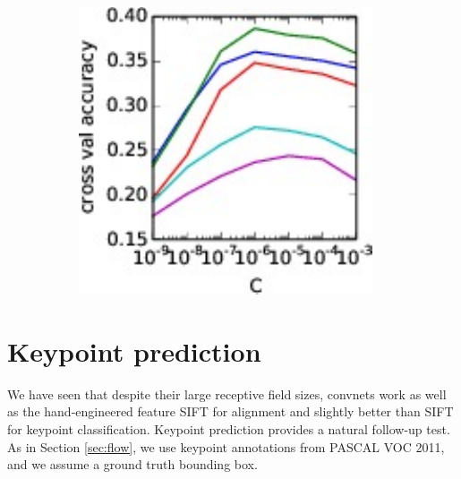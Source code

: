 \documentclass{article} %
\begin{document}
\begin{figure}[t]
\begin{minipage}{0.4\textwidth}
\begin{subfigure}{0.45\textwidth}
\caption{}
\end{subfigure}
\begin{subfigure}{0.45\textwidth}
\includegraphics[width=\textwidth]{figures/cat_cv_sift_nolegend.pdf}
\caption{}
\end{subfigure}
\label{fig:cv}
\end{minipage}
\end{figure}

\section{Keypoint prediction}
\label{sec:pred}

We have seen that 
despite their large receptive field sizes, convnets work as well as the hand-engineered
feature SIFT for alignment and slightly better than SIFT for
keypoint classification. Keypoint prediction provides a natural follow-up test.
As in Section \ref{sec:flow}, we use keypoint annotations from PASCAL VOC 2011,
and we assume a ground truth bounding box.
\end{document}

